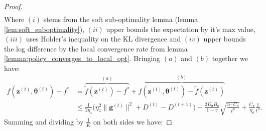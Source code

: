 \begin{proof}
\begin{align*}
\end{align*}
Where $(i)$ stems from the soft sub-optimality lemma (lemma \ref{lem:soft_suboptimality}), $(ii)$ upper bounds the expectation by it's max value, $(iii)$ uses Holder's inequality on the KL divergence and $(iv)$ upper bounds the log difference by the local convergence rate from lemma \ref{lemma:policy_converges_to_local_opt}.
Bringing $(a)$ and $(b)$ together we have:
\begin{align*}
    f(\bm{z}^{(t)},\bm{\theta}^{(t)}) - f^* &= 
    \overbrace{\tilde{f}(\bm{z}^{(t)}) - f^* }^{(a)}
    + \overbrace{f(\bm{z}^{(t)},\bm{\theta}^{(t)}) - \tilde{f}(\bm{z}^{(t)})}^{(b)}\\
    &\leq 
    \frac{1}{2\eta_z} \Big( 
         \eta_z^2\|\bm{g}^{(t)}\|^2
         + D^{(t)} - D^{(t+1)}
     \Big) 
     + \frac{2 D_{\bm{z}} B_a}{1 - \gamma}
     \sqrt{\frac{n \cdot C_\pi}{t^{u}}} 
     + \frac{C_\pi}{\eta_\theta} 
     \frac{1}{t^u}.
\end{align*}
Summing and dividing by $\frac{1}{K}$ on both sides we have:


\end{proof}
